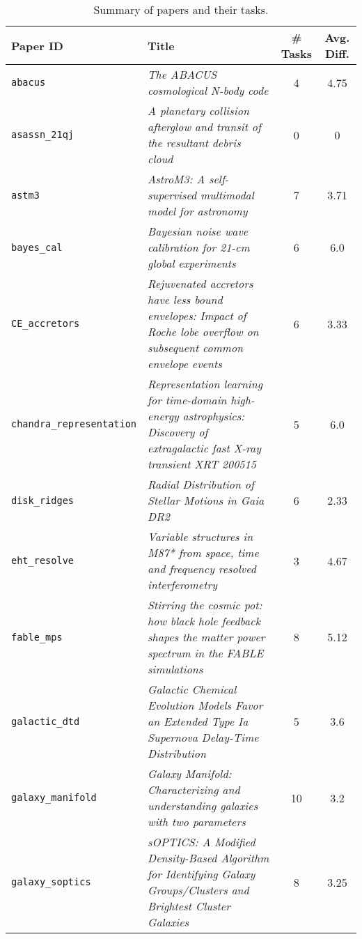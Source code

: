 \begin{table}[htbp]
\centering
\caption{Summary of papers and their tasks.}
\label{tab:paper_analysis}
\begin{tabular}{lp{7.5cm}cc}
\toprule
\textbf{Paper ID} & \textbf{Title} & \textbf{\# Tasks} & \textbf{Avg. Diff.} \\
\midrule
\small\texttt{abacus} & \small\textit{The ABACUS cosmological N-body code} \citep{abacus} & 4 & 4.75 \\
\small\texttt{asassn\_21qj} & \small\textit{A planetary collision afterglow and transit of the resultant debris cloud} \citep{asassn_21qj} & 0 & 0 \\
\small\texttt{astm3} & \small\textit{AstroM3: A self-supervised multimodal model for astronomy} \citep{astm3} & 7 & 3.71 \\
\small\texttt{bayes\_cal} & \small\textit{Bayesian noise wave calibration for 21-cm global experiments} \citep{bayes_cal} & 6 & 6.0 \\
\small\texttt{CE\_accretors} & \small\textit{Rejuvenated accretors have less bound envelopes: Impact of Roche lobe overflow on subsequent common envelope events} \citep{CE_accretors} & 6 & 3.33 \\
\small\texttt{chandra\_representation} & \small\textit{Representation learning for time-domain high-energy astrophysics: Discovery of extragalactic fast X-ray transient XRT 200515} \citep{chandra_representation} & 5 & 6.0 \\
\small\texttt{disk\_ridges} & \small\textit{Radial Distribution of Stellar Motions in Gaia DR2} \citep{disk_ridges} & 6 & 2.33 \\
\small\texttt{eht\_resolve} & \small\textit{Variable structures in M87* from space, time and frequency resolved interferometry} \citep{eht_resolve} & 3 & 4.67 \\
\small\texttt{fable\_mps} & \small\textit{Stirring the cosmic pot: how black hole feedback shapes the matter power spectrum in the FABLE simulations} \citep{fable_mps} & 8 & 5.12 \\
\small\texttt{galactic\_dtd} & \small\textit{Galactic Chemical Evolution Models Favor an Extended Type Ia Supernova Delay-Time Distribution} \citep{galactic_dtd} & 5 & 3.6 \\
\small\texttt{galaxy\_manifold} & \small\textit{Galaxy Manifold: Characterizing and understanding galaxies with two parameters} \citep{galaxy_manifold} & 10 & 3.2 \\
\small\texttt{galaxy\_soptics} & \small\textit{sOPTICS: A Modified Density-Based Algorithm for Identifying Galaxy Groups/Clusters and Brightest Cluster Galaxies} \citep{galaxy_soptics} & 8 & 3.25 \\

\end{tabular}
\end{table}
